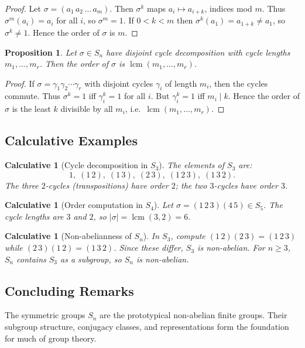 \documentclass[12pt]{article}
\newtheorem{proposition}[theorem]{Proposition}
\newtheorem{calculative}[theorem]{Calculative}
\theoremstyle{definition}
\begin{document}
\begin{proof}
Let $\sigma=(a_1\,a_2\,\dots\,a_m)$. Then $\sigma^k$ maps $a_i \mapsto a_{i+k}$, indices mod $m$.
Thus $\sigma^m(a_i)=a_i$ for all $i$, so $\sigma^m=1$. If $0<k<m$ then $\sigma^k(a_1)=a_{1+k}\neq a_1$, so $\sigma^k\neq 1$.
Hence the order of $\sigma$ is $m$.
\end{proof}

\begin{proposition}
Let $\sigma\in S_n$ have disjoint cycle decomposition with cycle lengths $m_1,\dots,m_r$.
Then the order of $\sigma$ is $\operatorname{lcm}(m_1,\dots,m_r)$.
\end{proposition}

\begin{proof}
If $\sigma=\gamma_1\gamma_2\cdots\gamma_r$ with disjoint cycles $\gamma_i$ of length $m_i$, then the cycles commute.
Thus $\sigma^k=1$ iff $\gamma_i^k=1$ for all $i$. But $\gamma_i^k=1$ iff $m_i\mid k$.
Hence the order of $\sigma$ is the least $k$ divisible by all $m_i$, i.e.\ $\operatorname{lcm}(m_1,\dots,m_r)$.
\end{proof}

\subsection*{Calculative Examples}

\begin{calculative}[Cycle decomposition in $S_3$]
The elements of $S_3$ are:
\[
1,\;(1\,2),\;(1\,3),\;(2\,3),\;(1\,2\,3),\;(1\,3\,2).
\]
The three $2$-cycles (transpositions) have order $2$; the two $3$-cycles have order $3$.
\end{calculative}

\begin{calculative}[Order computation in $S_4$]
Let $\sigma=(1\,2\,3)(4\,5)\in S_5$. The cycle lengths are $3$ and $2$, so
$|\sigma|=\operatorname{lcm}(3,2)=6$.
\end{calculative}

\begin{calculative}[Non-abelianness of $S_n$]
In $S_3$, compute $(1\,2)(2\,3)=(1\,2\,3)$ while $(2\,3)(1\,2)=(1\,3\,2)$.
Since these differ, $S_3$ is non-abelian. For $n\geq 3$, $S_n$ contains $S_3$ as a subgroup,
so $S_n$ is non-abelian.
\end{calculative}

\subsection*{Concluding Remarks}
The symmetric groups $S_n$ are the prototypical non-abelian finite groups.
Their subgroup structure, conjugacy classes, and representations form the foundation
for much of group theory.
\end{document}
